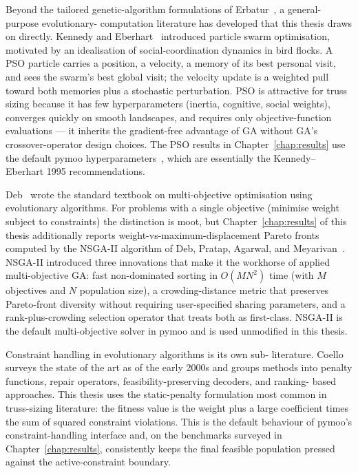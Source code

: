 Beyond the tailored genetic-algorithm formulations of
Erbatur~\cite{erbatur2000}, a general-purpose evolutionary-
computation literature has developed that this thesis draws on
directly. Kennedy and Eberhart~\cite{kennedy1995pso} introduced
particle swarm optimisation, motivated by an idealisation of
social-coordination dynamics in bird flocks. A PSO particle carries
a position, a velocity, a memory of its best personal visit, and
sees the swarm's best global visit; the velocity update is a
weighted pull toward both memories plus a stochastic perturbation.
PSO is attractive for truss sizing because it has few
hyperparameters (inertia, cognitive, social weights), converges
quickly on smooth landscapes, and requires only objective-function
evaluations --- it inherits the gradient-free advantage of GA
without GA's crossover-operator design choices. The PSO results in
Chapter~\ref{chap:results} use the default pymoo
hyperparameters~\cite{blank2020pymoo}, which are essentially the
Kennedy--Eberhart 1995 recommendations.

Deb~\cite{deb2001} wrote the standard textbook on multi-objective
optimisation using evolutionary algorithms. For problems with a
single objective (minimise weight subject to constraints) the
distinction is moot, but Chapter~\ref{chap:results} of this thesis
additionally reports weight-vs-maximum-displacement Pareto fronts
computed by the NSGA-II algorithm of Deb, Pratap, Agarwal, and
Meyarivan~\cite{deb2002nsga2}. NSGA-II introduced three
innovations that make it the workhorse of applied multi-objective
GA: fast non-dominated sorting in $O(MN^2)$ time (with $M$
objectives and $N$ population size), a crowding-distance metric
that preserves Pareto-front diversity without requiring
user-specified sharing parameters, and a rank-plus-crowding
selection operator that treats both as first-class. NSGA-II is the
default multi-objective solver in pymoo and is used unmodified in
this thesis.

Constraint handling in evolutionary algorithms is its own sub-
literature. Coello~\cite{coello2002} surveys the state of the art
as of the early 2000s and groups methods into penalty functions,
repair operators, feasibility-preserving decoders, and ranking-
based approaches. This thesis uses the static-penalty formulation
most common in truss-sizing literature: the fitness value is the
weight plus a large coefficient times the sum of squared
constraint violations. This is the default behaviour of pymoo's
constraint-handling interface and, on the benchmarks surveyed in
Chapter~\ref{chap:results}, consistently keeps the final feasible
population pressed against the active-constraint boundary.

